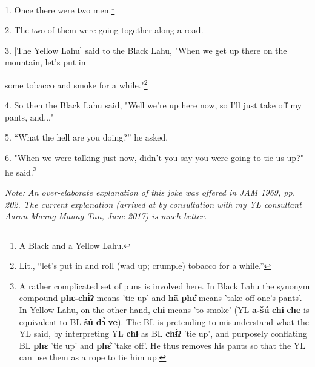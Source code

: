 \setcounter{footnote}{0}

1. Once there were two men.\footnote{A Black and a Yellow Lahu.}

2. The two of them were going together along a road.

3. [The Yellow Lahu] said to the Black Lahu, "When we get up there on the
mountain, let's put in

some tobacco and smoke for a while."\footnote{Lit., ``let's put in and roll (wad up; crumple) tobacco for a while.''}

4. So then the Black Lahu said, "Well we're up here now, so I'll just take
off my pants, and..."

5. ``What the hell are you doing?'' he asked.

6. "When we were talking just now, didn't you say you were going to tie
us up?" he said.\footnote{A rather complicated set of puns is involved here. In Black Lahu the synonym compound \textbf{phɛ-chɨ̀ʔ} means 'tie up' and \textbf{hā} \textbf{phɛ̂} means 'take off one's pants'. In Yellow Lahu, on the other hand, \textbf{chɨ} means 'to smoke' (YL \textbf{a-šú} \textbf{chɨ} \textbf{che} is equivalent to BL \textbf{šú} \textbf{dɔ̀} \textbf{ve}). The BL is pretending to misunderstand what the YL said, by interpreting YL \textbf{chɨ} as BL \textbf{chɨ̀ʔ} 'tie up', and purposely conflating BL \textbf{phɛ} 'tie up' and \textbf{phɛ̂} 'take off'. He thus removes his pants so that the YL can use them as a rope to tie him up.}

\textit{Note: An over-elaborate explanation of this joke was offered in JAM 1969,
pp. 202. The current explanation (arrived at by consultation with my YL consultant
Aaron Maung Maung Tun, June 2017) is much better.}

